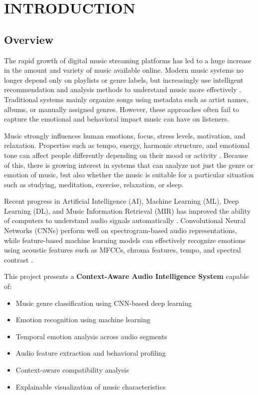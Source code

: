 \documentclass[12pt,a4paper]{report}
\begin{document}
\tableofcontents
\newpage
\listoftables
\newpage
\listoffigures
\newpage


\chapter{INTRODUCTION}

\section{Overview}

The rapid growth of digital music streaming platforms has led to a huge increase in the amount and variety of music available online. Modern music systems no longer depend only on playlists or genre labels, but increasingly use intelligent recommendation and analysis methods to understand music more effectively \cite{r1,r2}. Traditional systems mainly organize songs using metadata such as artist names, albums, or manually assigned genres. However, these approaches often fail to capture the emotional and behavioral impact music can have on listeners.

Music strongly influences human emotions, focus, stress levels, motivation, and relaxation. Properties such as tempo, energy, harmonic structure, and emotional tone can affect people differently depending on their mood or activity \cite{r3,r4}. Because of this, there is growing interest in systems that can analyze not just the genre or emotion of music, but also whether the music is suitable for a particular situation such as studying, meditation, exercise, relaxation, or sleep.

Recent progress in Artificial Intelligence (AI), Machine Learning (ML), Deep Learning (DL), and Music Information Retrieval (MIR) has improved the ability of computers to understand audio signals automatically \cite{r5,r6}. Convolutional Neural Networks (CNNs) perform well on spectrogram-based audio representations, while feature-based machine learning models can effectively recognize emotions using acoustic features such as MFCCs, chroma features, tempo, and spectral contrast \cite{r7,r8,r9,r10,r25,r26}.

This project presents a \textbf{Context-Aware Audio Intelligence System} capable of:

\begin{itemize}
    \item Music genre classification using CNN-based deep learning
    \item Emotion recognition using machine learning
    \item Temporal emotion analysis across audio segments
    \item Audio feature extraction and behavioral profiling
    \item Context-aware compatibility analysis
    \item Explainable visualization of music characteristics
\end{itemize}
\end{document}
